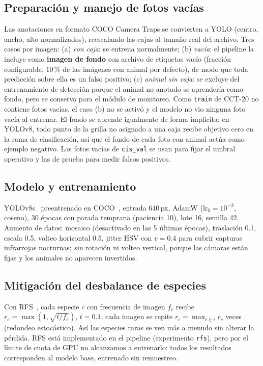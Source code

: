 \documentclass{article}
\begin{document}
\subsection{Preparación y manejo de fotos vacías}
Las anotaciones en formato COCO Camera Traps se convierten a YOLO (centro, ancho, alto normalizados),
reescalando las cajas al tamaño real del archivo. Tres casos por imagen: (a) \emph{con caja}: se
entrena normalmente; (b) \emph{vacía}: el pipeline la incluye como \textbf{imagen de fondo} con archivo
de etiquetas vacío (fracción configurable, 10\,\% de las imágenes con animal por defecto), de modo que
toda predicción sobre ella es un falso positivo; (c) \emph{animal sin caja}: se excluye del
entrenamiento de detección porque el animal no anotado se aprendería como fondo, pero se conserva para
el módulo de monitoreo. Como \texttt{train} de CCT-20 no contiene fotos vacías, el caso (b) no se activó
y el modelo no vio ninguna foto vacía al entrenar. El fondo se aprende igualmente de forma implícita: en
YOLOv8, todo punto de la grilla no asignado a una caja recibe objetivo cero en la rama de clasificación,
así que el fondo de cada foto con animal actúa como ejemplo negativo. Las fotos vacías de
\texttt{cis\_val} se usan para fijar el umbral operativo y las de prueba para medir falsos positivos.

\subsection{Modelo y entrenamiento}
YOLOv8s~\citep{jocher2023yolov8} preentrenado en COCO~\citep{lin2014coco}, entrada 640\,px, AdamW
($\text{lr}_0=10^{-3}$, coseno), 30 épocas con parada temprana (paciencia 10), lote 16, semilla 42.
Aumento de datos: mosaico (desactivado en las 5 últimas épocas), traslación 0.1, escala 0.5, volteo
horizontal 0.5, jitter HSV con $v=0.4$ para cubrir capturas infrarrojas nocturnas; \emph{sin}
rotación ni volteo vertical, porque las cámaras están fijas y los animales no aparecen invertidos.

\subsection{Mitigación del desbalance de especies}
Con RFS~\citep{gupta2019lvis}, cada especie $c$ con frecuencia de imagen $f_c$ recibe
$r_c=\max(1,\sqrt{t/f_c})$, $t=0.1$; cada imagen se repite $r_i=\max_{c\in i} r_c$ veces
(redondeo estocástico). Así las especies raras se ven más a menudo sin alterar la pérdida.
RFS está implementado en el pipeline (experimento \texttt{rfs}), pero por el límite de cuota de GPU
no alcanzamos a entrenarlo: todos los resultados corresponden al modelo base, entrenado sin remuestreo.
\end{document}
